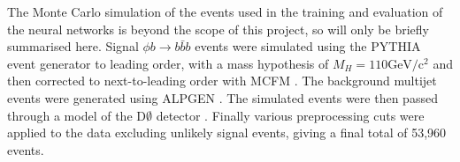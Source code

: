 
The Monte Carlo simulation of the events used in the training and evaluation of the neural networks is beyond the scope of this project, so will only be briefly summarised here. Signal $\phi b \rightarrow b\bar{b}b $ events were simulated using the PYTHIA event generator \cite{sjostrand2006pythia} to leading order, with a mass hypothesis  of $M_H = 110 \mathrm{GeV/c^2}$ and then corrected to next-to-leading order with MCFM \cite{campbell2010mcfm}. 
The background multijet events were generated using ALPGEN \cite{mangano2003alpgen}. The simulated events were then passed through a model of the D$\emptyset$ detector \cite{brun1993geant}.
Finally various preprocessing cuts were applied to the data excluding unlikely signal events, giving a final total of 53,960 events.
